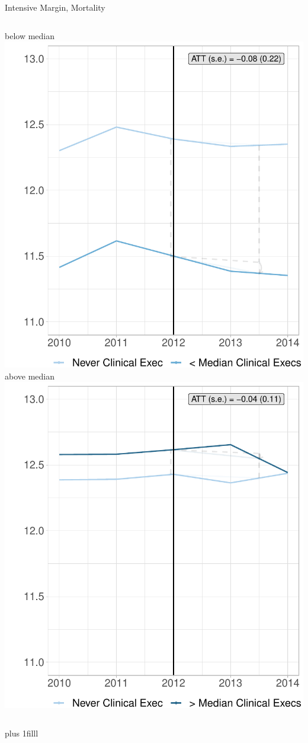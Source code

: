 \documentclass[notes,11pt, aspectratio=169]{beamer}
\newcommand{\btVFill}{\vskip0pt plus 1filll}
\begin{document}
\begin{frame}{Intensive Margin, Mortality}
    \begin{columns}
        \centering
        below median
        \includegraphics[width=.8\textwidth]{Objects/cont_belowmedmort_md_nomd_synth_graph.pdf}
        \centering
        above median
        \includegraphics[width=.8\textwidth]{Objects/cont_abovemedmort_md_nomd_synth_graph.pdf}
    \end{columns}
    \btVFill

    \hyperlink{main:readrates}{}
\end{frame}
\end{document}
